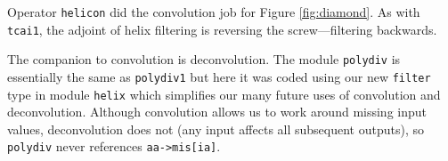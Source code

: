 \par
Operator {\tt helicon} did the convolution job for Figure \ref{fig:diamond}.
As with
\texttt{tcai1},
the adjoint of helix filtering is reversing the screw---filtering backwards.


\par
The companion to convolution is deconvolution.
The module \texttt{polydiv} 
is essentially the same as
\texttt{polydiv1} 
but here it was coded using
our new \texttt{filter} type in
module \texttt{helix} 
which simplifies our many future uses of
convolution and deconvolution.
Although convolution allows us to work around missing input values,
deconvolution does not
(any input affects all subsequent outputs),
so \texttt{polydiv} never references \verb#aa->mis[ia]#.



